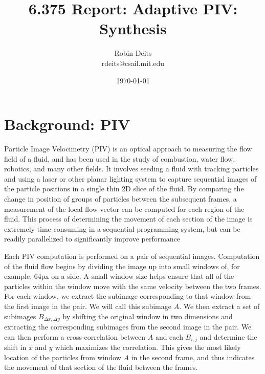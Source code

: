 \documentclass{article}
\begin{document}
	\author{Robin Deits\\ rdeits@csail.mit.edu}
	\title{6.375 Report: Adaptive PIV: Synthesis}
	\date{\today}
	\maketitle

	\tableofcontents

	\section{Background: PIV} %
	\label{sec:background}
	Particle Image Velocimetry (PIV) is an optical approach to measuring the flow field of a fluid, and has been used in the study of combustion, water flow, robotics, and many other fields. It involves seeding a fluid with tracking particles and using a laser or other planar lighting system to capture sequential images of the particle positions in a single thin 2D slice of the fluid. By comparing the change in position of groups of particles between the subsequent frames, a measurement of the local flow vector can be computed for each region of the fluid. This process of determining the movement of each section of the image is extremely time-consuming in a sequential programming system, but can be readily parallelized to significantly improve performance \citep{Yu:2006tb}

	Each PIV computation is performed on a pair of sequential images. Computation of the fluid flow begins by dividing the image up into small windows of, for example, 64px on a side. A small window size helps ensure that all of the particles within the window move with the same velocity between the two frames. For each window, we extract the subimage corresponding to that window from the first image in the pair. We will call this subimage $A$. We then extract a set of subimages $B_{\Delta x,  \Delta y}$ by shifting the original window in two dimensions and extracting the corresponding subimages from the second image in the pair. We can then perform a cross-correlation between $A$ and each $B_{i, j}$ and determine the shift in $x$ and $y$ which maximizes the correlation. This gives the most likely location of the particles from window $A$ in the second frame, and thus indicates the movement of that section of the fluid between the frames.
\end{document}
